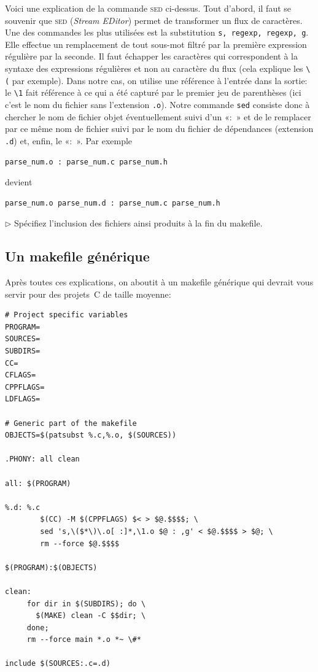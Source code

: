 \documentclass[11pt,a4paper]{article}
\newcommand{\must}{\noindent $\triangleright$ \xspace}
\begin{document}
Voici une explication de la commande \textsc{sed} ci-dessus. Tout
d'abord, il faut se souvenir que \textsc{sed} (\emph{Stream EDitor})
permet de transformer un flux de caractères. Une des commandes les
plus utilisées est la substitution
\texttt{s, regexp, regexp, g}. Elle effectue un remplacement de
tout sous-mot filtré par la première expression régulière par la
seconde. Il faut échapper les caractères qui correspondent à la
syntaxe des expressions régulières et non au caractère du flux (cela
explique les \verb!\(! par exemple). Dans notre cas, on utilise une
référence à l'entrée dans la sortie: le \verb!\1! fait référence à ce
qui a été capturé par le premier jeu de parenthèses (ici c'est le nom
du fichier sans l'extension \texttt{.o}). Notre commande \texttt{sed}
consiste donc à chercher le nom de fichier objet éventuellement suivi
d'un «:~» et de le remplacer par ce même nom de fichier suivi par le
nom du fichier de dépendances (extension \texttt{.d}) et, enfin, le
«:~». Par exemple
{\small
\begin{verbatim}
parse_num.o : parse_num.c parse_num.h
\end{verbatim}
}
\noindent devient
{\small
\begin{verbatim}
parse_num.o parse_num.d : parse_num.c parse_num.h
\end{verbatim}
}

\must Spécifiez l'inclusion des fichiers ainsi produits à la fin du
makefile.

\subsection{Un makefile générique}

Après toutes ces explications, on aboutit à un makefile
générique qui devrait vous servir pour des projets~C de taille
moyenne:
{\small
\begin{verbatim}
# Project specific variables
PROGRAM=
SOURCES=
SUBDIRS=
CC=
CFLAGS=
CPPFLAGS=
LDFLAGS=

# Generic part of the makefile
OBJECTS=$(patsubst %.c,%.o, $(SOURCES))

.PHONY: all clean

all: $(PROGRAM)

%.d: %.c
        $(CC) -M $(CPPFLAGS) $< > $@.$$$$; \
        sed 's,\($*\)\.o[ :]*,\1.o $@ : ,g' < $@.$$$$ > $@; \
        rm --force $@.$$$$

$(PROGRAM):$(OBJECTS)

clean:
     for dir in $(SUBDIRS); do \
       $(MAKE) clean -C $$dir; \
     done;
     rm --force main *.o *~ \#*

include $(SOURCES:.c=.d)
\end{verbatim}
}
\end{document}

